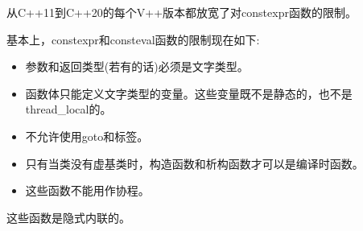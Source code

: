 从C++11到C++20的每个V++版本都放宽了对constexpr函数的限制。

基本上，constexpr和consteval函数的限制现在如下:

\begin{itemize}
\item 
参数和返回类型(若有的话)必须是文字类型。

\item
函数体只能定义文字类型的变量。这些变量既不是静态的，也不是thread\_local的。

\item
不允许使用goto和标签。

\item
只有当类没有虚基类时，构造函数和析构函数才可以是编译时函数。

\item
这些函数不能用作协程。
\end{itemize}

这些函数是隐式内联的。